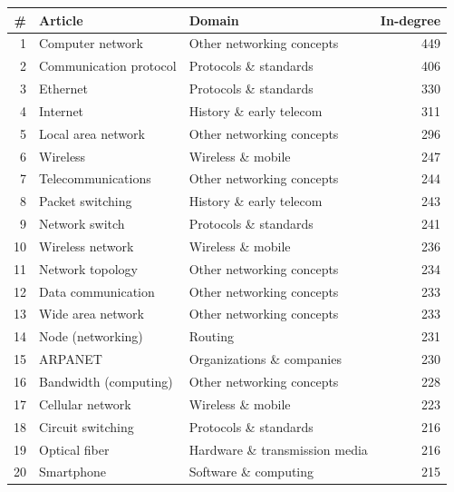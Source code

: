 
\begin{tabular}{rllr}
\toprule
\# & Article & Domain & In-degree\\
\midrule
1 & Computer network & Other networking concepts & 449\\
2 & Communication protocol & Protocols \& standards & 406\\
3 & Ethernet & Protocols \& standards & 330\\
4 & Internet & History \& early telecom & 311\\
5 & Local area network & Other networking concepts & 296\\
6 & Wireless & Wireless \& mobile & 247\\
7 & Telecommunications & Other networking concepts & 244\\
8 & Packet switching & History \& early telecom & 243\\
9 & Network switch & Protocols \& standards & 241\\
10 & Wireless network & Wireless \& mobile & 236\\
11 & Network topology & Other networking concepts & 234\\
12 & Data communication & Other networking concepts & 233\\
13 & Wide area network & Other networking concepts & 233\\
14 & Node (networking) & Routing & 231\\
15 & ARPANET & Organizations \& companies & 230\\
16 & Bandwidth (computing) & Other networking concepts & 228\\
17 & Cellular network & Wireless \& mobile & 223\\
18 & Circuit switching & Protocols \& standards & 216\\
19 & Optical fiber & Hardware \& transmission media & 216\\
20 & Smartphone & Software \& computing & 215\\
\bottomrule
\end{tabular}
